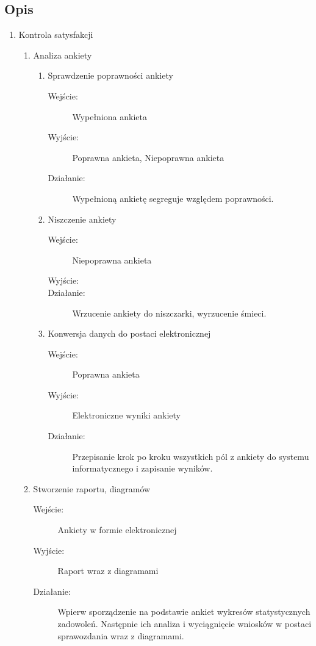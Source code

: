 \documentclass[a4paper, 11pt]{article}
\begin{document}
	
	


	\subsection{Opis}
	\begin{enumerate}[label*=\arabic*.]
		\item Kontrola satysfakcji
		\begin{enumerate}[label*=\arabic*.]
			\item Analiza ankiety
			\begin{enumerate}[label*=\arabic*.]
				\item Sprawdzenie poprawności ankiety
				\begin{description}
					\item[Wejście:]	Wypełniona ankieta 
					\item[Wyjście:]	Poprawna ankieta, Niepoprawna ankieta
					\item[Działanie:] Wypełnioną ankietę segreguje względem poprawności.
				\end{description}				
				\item Niszczenie ankiety
				\begin{description}
					\item[Wejście:] Niepoprawna ankieta
					\item[Wyjście:] 
					\item[Działanie:] Wrzucenie ankiety do niszczarki, wyrzucenie śmieci.
				\end{description}				
				\item Konwersja danych do postaci elektronicznej
				\begin{description}
					\item[Wejście:] Poprawna ankieta
					\item[Wyjście:] Elektroniczne wyniki ankiety
					\item[Działanie:] Przepisanie krok po kroku wszystkich pól z ankiety do systemu informatycznego i zapisanie wyników.
				\end{description}	
			\end{enumerate}
			\item Stworzenie raportu, diagramów
			\begin{description}
				\item[Wejście:] Ankiety w formie elektronicznej
				\item[Wyjście:] Raport wraz z diagramami
				\item[Działanie:] Wpierw sporządzenie na podstawie ankiet wykresów statystycznych zadowoleń. Następnie ich analiza i wyciągnięcie wniosków w postaci sprawozdania wraz z diagramami.

\end{description}
\end{enumerate}
\end{enumerate}
\end{document}
